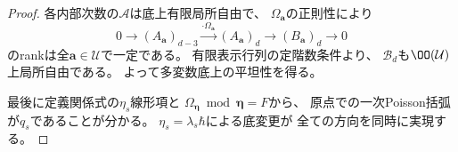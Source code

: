 \begin{proof}
各内部次数の$\mathcal A$は底上有限局所自由で、
$\Omega_{\boldsymbol a}$の正則性により
\begin{equation}
 0\longrightarrow(A_{\boldsymbol a})_{d-3}
 \xrightarrow{\cdot\Omega_{\boldsymbol a}}
 (A_{\boldsymbol a})_d
 \longrightarrow(B_{\boldsymbol a})_d
 \longrightarrow0
\end{equation}
のrankは全$\boldsymbol a\in\mathcal U$で一定である。
有限表示行列の定階数条件より、
$\mathcal B_d$も$\OO(\mathcal U)$上局所自由である。
よって多変数底上の平坦性を得る。

最後に定義関係式の$\eta_s$線形項と
$\Omega_{\boldsymbol\eta}\bmod\boldsymbol\eta=F$から、
原点での一次Poisson括弧が$q_s$であることが分かる。
$\eta_s=\lambda_s\hbar$による底変更が
全ての方向を同時に実現する。
\end{proof}


